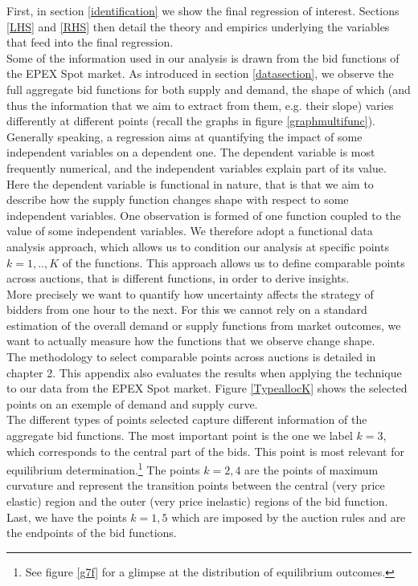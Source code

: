 \label{strat}

First, in section \ref{identification} we show the final regression of interest. Sections \ref{LHS} and \ref{RHS} then detail the theory and empirics underlying the variables that feed into the final regression. \\

Some of the information used in our analysis is drawn from the bid functions of the EPEX Spot market. As introduced in section \ref{datasection}, we observe the full aggregate bid functions for both supply and demand, the shape of which (and thus the information that we aim to extract from them, e.g. their slope) varies differently at different points (recall the graphs in figure \ref{graphmultifunc}). \\

Generally speaking, a regression aims at quantifying the impact of some independent variables on a dependent one. The dependent variable is most frequently numerical, and the independent variables explain part of its value. Here the dependent variable is functional in nature, that is that we aim to describe how the supply function changes shape with respect to some independent variables. One observation is formed of one function coupled to the value of some independent variables. We therefore adopt a functional data analysis approach, which allows us to condition our analysis at specific points $k=1,..,K$ of the functions. This approach allows us to define comparable points across auctions, that is different functions, in order to derive insights. \\

More precisely we want to quantify how uncertainty affects the strategy of bidders from one hour to the next. For this we cannot rely on a standard estimation of the overall demand or supply functions from market outcomes, we want to actually measure how the functions that we observe change shape. \\

The methodology to select comparable points across auctions is detailed in chapter 2. This appendix also evaluates the results when applying the technique to our data from the EPEX Spot market. Figure \ref{TypeallocK} shows the selected points on an exemple of demand and supply curve. \\

The different types of points selected capture different information of the aggregate bid functions. The most important point is the one we label $k=3$, which corresponds to the central part of the bids. This point is most relevant for equilibrium determination.\footnote{See figure \ref{g7f} for a glimpse at the distribution of equilibrium outcomes.} The points $k=2,4$ are the points of maximum curvature and represent the transition points between the central (very price elastic) region and the outer (very price inelastic) regions of the bid function. Last, we have the points $k=1,5$ which are imposed by the auction rules and are the endpoints of the bid functions. \\

